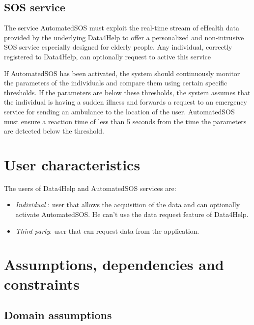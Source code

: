 \subsection{SOS service}
The service AutomatedSOS must exploit the real-time stream of eHealth data provided by the underlying Data4Help to offer a personalized and non-intrusive SOS service especially designed for elderly people.
Any individual, correctly registered to Data4Help, can optionally request to active this service


If AutomatedSOS has been activated, the system should continuously monitor the parameters of the individuals and compare them using certain specific thresholds.
If the parameters are below these thresholds, the system assumes that the individual is having a sudden illness and forwards a request to an emergency service for sending an ambulance to the location of the user.
AutomatedSOS must ensure a reaction time of less than 5 seconds from the time the parameters are detected below the threshold.










\section{User characteristics}
The users of Data4Help and AutomatedSOS services are:

\begin{itemize}
\item \textit{Individual} : user that allows the acquisition of the data and can optionally activate AutomatedSOS. He can't use the data request feature of Data4Help.
\item \textit{Third party}: user that can request data from the application.
\end{itemize}





\section{Assumptions, dependencies and constraints}

\subsection{Domain assumptions}

